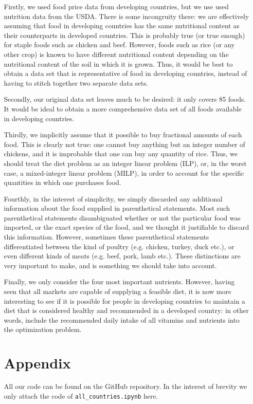 Firstly, we used food price data from developing countries, but we use used nutrition data from the USDA. There is some incongruity there: we are effectively assuming that food in developing countries has the same nutritional content as their counterparts in developed countries. This is probably true (or true enough) for staple foods such as chicken and beef. However, foods such as rice (or any other crop) is known to have different nutritional content depending on the nutritional content of the soil in which it is grown. Thus, it would be best to obtain a data set that is representative of food in developing countries, instead of having to stitch together two separate data sets.

Secondly, our original data set leaves much to be desired: it only covers 85 foods. It would be ideal to obtain a more comprehensive data set of all foods available in developing countries.

Thirdly, we implicitly assume that it possible to buy fractional amounts of each food. This is clearly not true: one cannot buy anything but an integer number of chickens, and it is improbable that one can buy any quantity of rice. Thus, we should treat the diet problem as an integer linear problem (ILP), or, in the worst case, a mixed-integer linear problem (MILP), in order to account for the specific quantities in which one purchases food.

Fourthly, in the interest of simplicity, we simply discarded any additional information about the food supplied in parenthetical statements. Most such parenthetical statements disambiguated whether or not the particular food was imported, or the exact species of the food, and we thought it justifiable to discard this information. However, sometimes these parenthetical statements differentiated between the kind of poultry (e.g. chicken, turkey, duck etc.), or even different kinds of meats (e.g. beef, pork, lamb etc.). These distinctions are very important to make, and is something we should take into account.

Finally, we only consider the four most important nutrients. However, having seen that all markets are capable of supplying a feasible diet, it is now more interesting to see if it is possible for people in developing countries to maintain a diet that is considered healthy and recommended in a developed country: in other words, include the recommended daily intake of all vitamins and nutrients into the optimization problem.




\section{Appendix}
All our code can be found on the GitHub repository.\cite{eigenfoo} In the
interest of brevity we only attach the code of \texttt{all\_countries.ipynb}
here.




